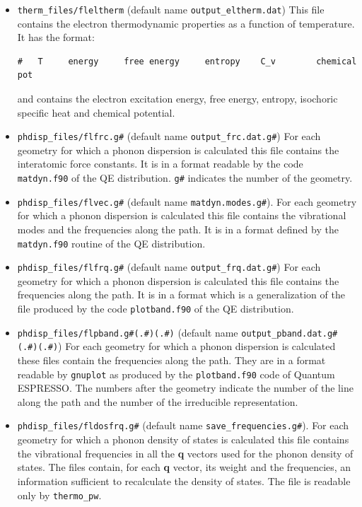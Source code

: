 \documentclass[12pt,a4paper]{article}
\def\qe{{\sc Quantum ESPRESSO}}
\begin{document}
\begin{itemize}
\item 
\texttt{therm\_files/fleltherm} (default name \texttt{output\_eltherm.dat})
This file contains the electron thermodynamic properties as a function of
temperature. It has the format:
\begin{verbatim}
#   T     energy     free energy     entropy    C_v        chemical pot
\end{verbatim}
and contains the electron excitation energy, free energy, entropy, 
isochoric specific heat and chemical potential.

\item 
\texttt{phdisp\_files/flfrc.g\#} (default name \texttt{output\_frc.dat.g\#})
For each geometry for which a phonon dispersion is calculated this file
contains the interatomic force constants. It is in a format readable by
the code \texttt{matdyn.f90} of the QE distribution. \texttt{g\#} indicates 
the number of the geometry.

\item 
\texttt{phdisp\_files/flvec.g\#} (default name 
\texttt{matdyn.modes.g\#}). For each geometry for which a phonon dispersion
is calculated this file contains the vibrational modes and the frequencies
along the path. It is in a format defined by the \texttt{matdyn.f90} routine 
of the QE distribution.

\item 
\texttt{phdisp\_files/flfrq.g\#} (default name \texttt{output\_frq.dat.g\#})
For each geometry for which a phonon dispersion is calculated this file
contains the frequencies along the path. It is in a format which is a 
generalization of the file produced by the code \texttt{plotband.f90} of 
the QE distribution.

\item 
\texttt{phdisp\_files/flpband.g\#(.\#)(.\#)} 
(default name \texttt{output\_pband.dat.g\#(.\#)(.\#)})
For each geometry for which a phonon dispersion is calculated these files
contain the frequencies along the path. They are in a format readable by
\texttt{gnuplot} as produced by the \texttt{plotband.f90} code of \qe.
The numbers after the geometry indicate the number of the line 
along the path and the number of the irreducible representation.

\item 
\texttt{phdisp\_files/fldosfrq.g\#} (default name 
\texttt{save\_frequencies.g\#}). For each geometry for which a phonon 
density of states is calculated this file contains the vibrational  
frequencies in all the {\bf q} vectors used for the phonon density of states.
The files contain, for each {\bf q} vector, its weight and the frequencies,
an information sufficient to recalculate the density of states.
The file is readable only by \texttt{thermo\_pw}.


\end{itemize}
\end{document}
